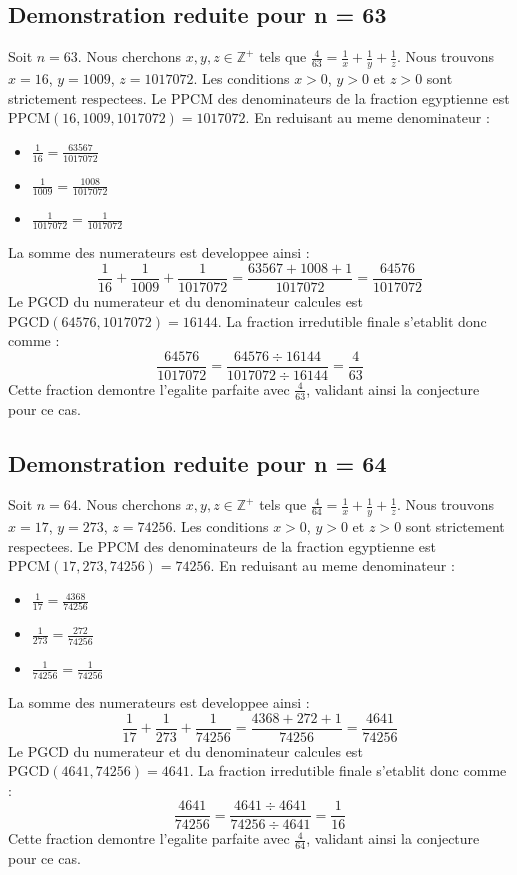 \documentclass[11pt,a4paper]{article}
\begin{document}
\subsection{Demonstration reduite pour n = 63}
Soit $n = 63$. Nous cherchons $x, y, z \in \mathbb{Z}^{+}$ tels que $\frac{4}{63} = \frac{1}{x} + \frac{1}{y} + \frac{1}{z}$.
Nous trouvons $x = 16$, $y = 1009$, $z = 1017072$.
Les conditions $x > 0$, $y > 0$ et $z > 0$ sont strictement respectees.
Le PPCM des denominateurs de la fraction egyptienne est $\text{PPCM}(16, 1009, 1017072) = 1017072$.
En reduisant au meme denominateur :
\begin{itemize}
    \item $\frac{1}{16} = \frac{63567}{1017072}$
    \item $\frac{1}{1009} = \frac{1008}{1017072}$
    \item $\frac{1}{1017072} = \frac{1}{1017072}$
\end{itemize}
La somme des numerateurs est developpee ainsi :
$$ \frac{1}{16} + \frac{1}{1009} + \frac{1}{1017072} = \frac{63567 + 1008 + 1}{1017072} = \frac{64576}{1017072} $$
Le PGCD du numerateur et du denominateur calcules est $\text{PGCD}(64576, 1017072) = 16144$.
La fraction irredutible finale s'etablit donc comme :
$$ \frac{64576}{1017072} = \frac{64576 \div 16144}{1017072 \div 16144} = \frac{4}{63} $$
Cette fraction demontre l'egalite parfaite avec $\frac{4}{63}$, validant ainsi la conjecture pour ce cas.

\subsection{Demonstration reduite pour n = 64}
Soit $n = 64$. Nous cherchons $x, y, z \in \mathbb{Z}^{+}$ tels que $\frac{4}{64} = \frac{1}{x} + \frac{1}{y} + \frac{1}{z}$.
Nous trouvons $x = 17$, $y = 273$, $z = 74256$.
Les conditions $x > 0$, $y > 0$ et $z > 0$ sont strictement respectees.
Le PPCM des denominateurs de la fraction egyptienne est $\text{PPCM}(17, 273, 74256) = 74256$.
En reduisant au meme denominateur :
\begin{itemize}
    \item $\frac{1}{17} = \frac{4368}{74256}$
    \item $\frac{1}{273} = \frac{272}{74256}$
    \item $\frac{1}{74256} = \frac{1}{74256}$
\end{itemize}
La somme des numerateurs est developpee ainsi :
$$ \frac{1}{17} + \frac{1}{273} + \frac{1}{74256} = \frac{4368 + 272 + 1}{74256} = \frac{4641}{74256} $$
Le PGCD du numerateur et du denominateur calcules est $\text{PGCD}(4641, 74256) = 4641$.
La fraction irredutible finale s'etablit donc comme :
$$ \frac{4641}{74256} = \frac{4641 \div 4641}{74256 \div 4641} = \frac{1}{16} $$
Cette fraction demontre l'egalite parfaite avec $\frac{4}{64}$, validant ainsi la conjecture pour ce cas.
\end{document}
